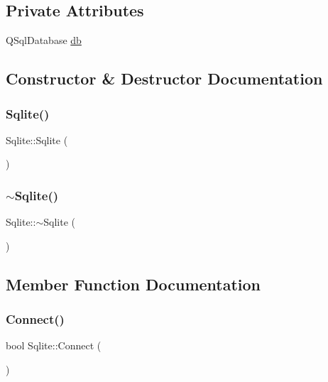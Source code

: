 \subsection*{Private Attributes}
\begin{DoxyCompactItemize}
\item 
Q\+Sql\+Database \mbox{\hyperlink{class_sqlite_afaaed0591ef0d92547dc5f049a22b3a6}{db}}
\end{DoxyCompactItemize}


\subsection{Constructor \& Destructor Documentation}
\mbox{\label{class_sqlite_a8aef4e64531e1522f892c0c6ec69cdff}} 
\subsubsection{\texorpdfstring{Sqlite()}{Sqlite()}}
{\footnotesize\ttfamily Sqlite\+::\+Sqlite (\begin{DoxyParamCaption}{ }\end{DoxyParamCaption})}

\mbox{\label{class_sqlite_adc35a543dca91edc3ffb90a3825dd54a}} 
\subsubsection{\texorpdfstring{$\sim$Sqlite()}{~Sqlite()}}
{\footnotesize\ttfamily Sqlite\+::$\sim$\+Sqlite (\begin{DoxyParamCaption}{ }\end{DoxyParamCaption})}



\subsection{Member Function Documentation}
\mbox{\label{class_sqlite_aa93509c1e19a7d486f4f38ff4bc78a89}} 
\subsubsection{\texorpdfstring{Connect()}{Connect()}}
{\footnotesize\ttfamily bool Sqlite\+::\+Connect (\begin{DoxyParamCaption}{ }\end{DoxyParamCaption})}

